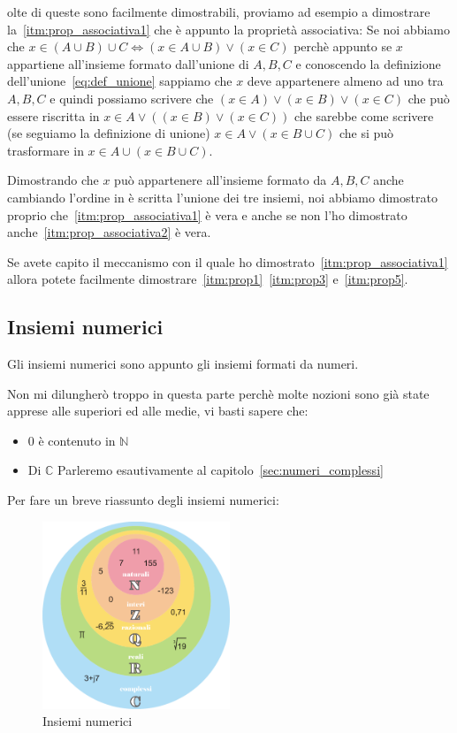 \documentclass{article}
\begin{document}
olte di queste sono facilmente dimostrabili, proviamo ad esempio a dimostrare la~\ref{itm:prop_associativa1} che è appunto la proprietà associativa: \newline
Se noi abbiamo che $x \in (A \cup B) \cup C \Leftrightarrow (x \in A \cup B) \lor (x \in C)$ perchè appunto se $x$ appartiene all'insieme formato dall'unione di $A,B,C$ e conoscendo la definizione dell'unione~\ref{eq:def_unione}  sappiamo che $x$ deve appartenere almeno ad uno tra $A,B,C$ e quindi possiamo scrivere che $(x \in A) \lor (x \in B) \lor (x \in C)$ che può essere riscritta in $x \in A \lor ((x \in B) \lor (x \in C))$ che sarebbe come scrivere (se seguiamo la definizione di unione) $x \in A \lor (x \in B \cup C)$ che si può trasformare in $x \in A \cup (x \in B \cup C)$. \par
Dimostrando che $x$ può appartenere all'insieme formato da $A,B,C$ anche cambiando l'ordine in è scritta l'unione dei tre insiemi, noi abbiamo dimostrato proprio che~\ref{itm:prop_associativa1} è vera e anche se non l'ho dimostrato anche~\ref{itm:prop_associativa2} è vera.\par
Se avete capito il meccanismo con il quale ho dimostrato~\ref{itm:prop_associativa1} allora potete facilmente dimostrare~\ref{itm:prop1}~\ref{itm:prop3} e~\ref{itm:prop5}.



\subsection{Insiemi numerici}
Gli insiemi numerici sono appunto gli insiemi formati da numeri. \par
Non mi dilungherò troppo in questa parte perchè molte nozioni sono già state apprese alle superiori ed alle medie, vi basti sapere che:
\begin{itemize}
        \item $0$ è contenuto in $\mathbb{N}$
        \item Di $\mathbb{C}$ Parleremo esautivamente al capitolo~\ref{sec:numeri_complessi} 
\end{itemize}

Per fare un breve riassunto degli insiemi numerici:
\begin{figure}[h]
        \centering
                \includegraphics[width=0.5\textwidth]{insiemi_numerici.png}
        \caption{Insiemi numerici}\label{fig:insiemi_numerici}
\end{figure}
\end{document}
